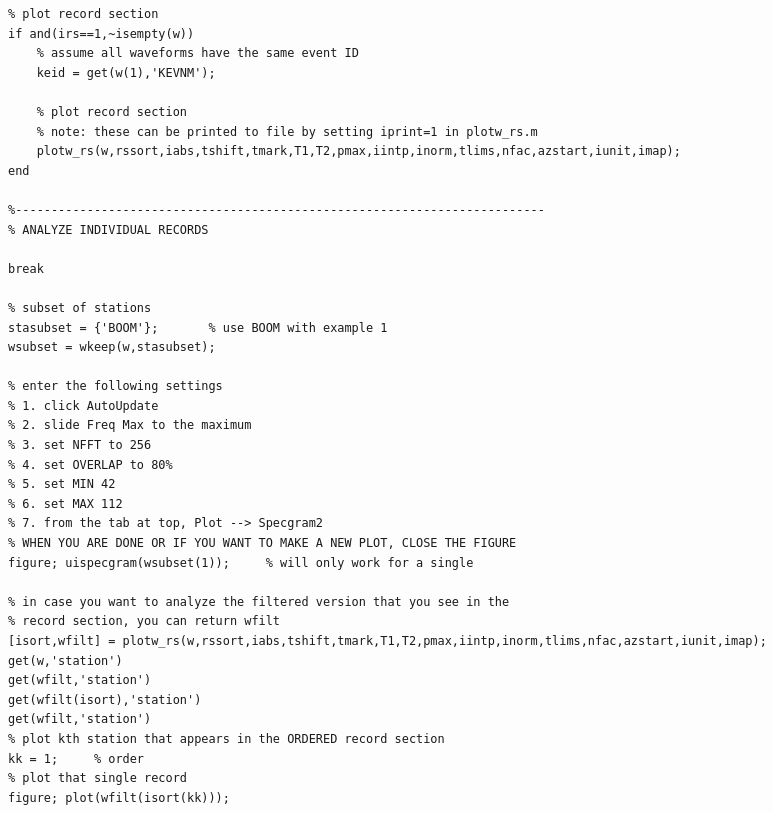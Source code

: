 \documentclass[11pt,titlepage,fleqn]{article}
\begin{document}
\begin{spacing}{1.0}
\begin{verbatim}
% plot record section
if and(irs==1,~isempty(w))
    % assume all waveforms have the same event ID
    keid = get(w(1),'KEVNM');

    % plot record section
    % note: these can be printed to file by setting iprint=1 in plotw_rs.m
    plotw_rs(w,rssort,iabs,tshift,tmark,T1,T2,pmax,iintp,inorm,tlims,nfac,azstart,iunit,imap);
end

%--------------------------------------------------------------------------
% ANALYZE INDIVIDUAL RECORDS

break

% subset of stations
stasubset = {'BOOM'};       % use BOOM with example 1
wsubset = wkeep(w,stasubset);

% enter the following settings
% 1. click AutoUpdate
% 2. slide Freq Max to the maximum
% 3. set NFFT to 256
% 4. set OVERLAP to 80%
% 5. set MIN 42
% 6. set MAX 112
% 7. from the tab at top, Plot --> Specgram2
% WHEN YOU ARE DONE OR IF YOU WANT TO MAKE A NEW PLOT, CLOSE THE FIGURE
figure; uispecgram(wsubset(1));     % will only work for a single 

% in case you want to analyze the filtered version that you see in the
% record section, you can return wfilt
[isort,wfilt] = plotw_rs(w,rssort,iabs,tshift,tmark,T1,T2,pmax,iintp,inorm,tlims,nfac,azstart,iunit,imap);
get(w,'station')
get(wfilt,'station')
get(wfilt(isort),'station')
get(wfilt,'station')
% plot kth station that appears in the ORDERED record section
kk = 1;     % order 
% plot that single record
figure; plot(wfilt(isort(kk)));
\end{verbatim}
\end{spacing}

\fi

\end{document}
